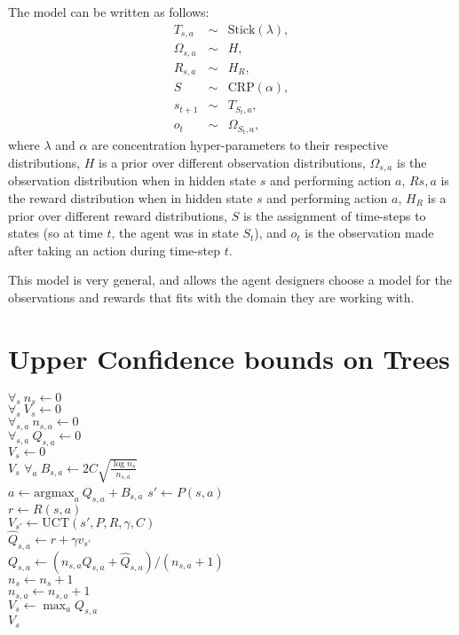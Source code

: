 The model can be written as follows:
\begin{eqnarray}
T_{s,a} &\sim& \mbox{Stick}(\lambda),\\
\Omega_{s,a} &\sim& H,\\
R_{s,a} &\sim& H_R,\\
S &\sim& \mbox{CRP}(\alpha),\\
s_{t+1} &\sim& T_{S_t,a},\\
o_t &\sim& \Omega_{S_t,a},
\end{eqnarray}
where $\lambda$ and $\alpha$ are concentration hyper-parameters to their respective distributions, $H$ is a prior over different observation distributions, $\Omega_{s,a}$ is the observation distribution when in hidden state $s$ and performing action $a$, $R{s,a}$ is the reward distribution when in hidden state $s$ and performing action $a$, $H_R$ is a prior over different reward distributions, $S$ is the assignment of time-steps to states (so at time $t$, the agent was in state $S_t$), and $o_t$ is the observation made after taking an action during time-step $t$.

This model is very general, and allows the agent designers choose a model for the observations and rewards that fits with the domain they are working with.

\section{Upper Confidence bounds on Trees}

\begin{algorithm}[tb]
	\caption{$\mbox{UCT}(s, P, R, \gamma, C)$}
	\label{alg:uct}
	$\forall_{s} ~ n_{s} \leftarrow 0$\\
	$\forall_{s} ~ V_{s} \leftarrow 0$\\
	$\forall_{s,a} ~ n_{s,a} \leftarrow 0$\\
	$\forall_{s,a} ~ Q_{s,a} \leftarrow 0$\\

	 {
		$V_s \leftarrow 0$\\
		\Return $V_s$
	}
	 {
		$\forall_a ~ B_{s,a} \leftarrow 2 C \sqrt{\frac{\log n_{s}}{n_{s,a}}}$\\
		$a \leftarrow \mbox{argmax}_a ~ Q_{s,a}+B_{s,a}$
	}
	$s' \leftarrow P(s,a)$\\
	$r \leftarrow R(s,a)$\\
	$V_{s'} \leftarrow \mbox{UCT}(s', P, R, \gamma, C)$\\
	$\hat Q_{s,a} \leftarrow r+\gamma v_{s'}$\\
	$Q_{s,a} \leftarrow (n_{s,a}Q_{s,a}+\hat Q_{s,a})/(n_{s,a}+1)$\\
	$n_s \leftarrow n_s+1$\\
	$n_{s,a} \leftarrow n_{s,a}+1$\\
	$V_s \leftarrow \max_a Q_{s,a}$\\
	\Return $V_s$
\end{algorithm}


